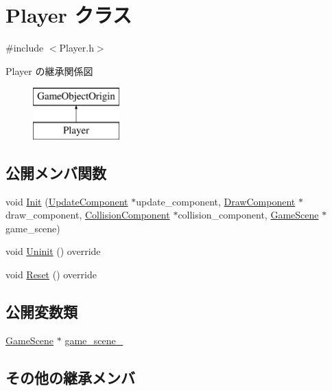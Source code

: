 \hypertarget{class_player}{}\section{Player クラス}
\label{class_player}


{\ttfamily \#include $<$Player.\+h$>$}

Player の継承関係図\begin{figure}[H]
\begin{center}
\leavevmode
\includegraphics[height=2.000000cm]{class_player}
\end{center}
\end{figure}
\subsection*{公開メンバ関数}
\begin{DoxyCompactItemize}
\item 
void \mbox{\hyperlink{class_player_aec4f49cae0911b3e2cfe02a84e2dc98e}{Init}} (\mbox{\hyperlink{class_update_component}{Update\+Component}} $\ast$update\+\_\+component, \mbox{\hyperlink{class_draw_component}{Draw\+Component}} $\ast$draw\+\_\+component, \mbox{\hyperlink{class_collision_component}{Collision\+Component}} $\ast$collision\+\_\+component, \mbox{\hyperlink{class_game_scene}{Game\+Scene}} $\ast$game\+\_\+scene)
\item 
void \mbox{\hyperlink{class_player_a7455a83ac23d2f5e0cce0ddd7d92db0c}{Uninit}} () override
\item 
void \mbox{\hyperlink{class_player_a457153d0edd58932e37e1356f5fe5fed}{Reset}} () override
\end{DoxyCompactItemize}
\subsection*{公開変数類}
\begin{DoxyCompactItemize}
\item 
\mbox{\hyperlink{class_game_scene}{Game\+Scene}} $\ast$ \mbox{\hyperlink{class_player_ab41e7ebf6f975f2eea365923bc2dca7f}{game\+\_\+scene\+\_\+}}
\end{DoxyCompactItemize}
\subsection*{その他の継承メンバ}


